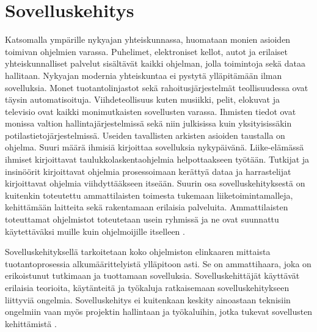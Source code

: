 \documentclass[utf8]{gradu3}
\begin{document}
\chapter{Sovelluskehitys}
Katsomalla ympärille nykyajan yhteiskunnassa, huomataan monien asioiden toimivan ohjelmien varassa. Puhelimet, elektroniset kellot, autot ja erilaiset yhteiskunnalliset palvelut sisältävät kaikki ohjelman, jolla toimintoja sekä dataa hallitaan. Nykyajan modernia yhteiskuntaa ei pystytä ylläpitämään ilman sovelluksia. Monet tuotantolinjastot sekä rahoitusjärjestelmät teollisuudessa ovat täysin automatisoituja. Viihdeteollisuus kuten musiikki, pelit, elokuvat ja televisio ovat kaikki monimutkaisten sovellusten varassa. Ihmisten tiedot ovat monissa valtion hallintajärjestelmissä sekä niin julkisissa kuin yksityisissäkin potilastietojärjestelmissä. Useiden tavallisten arkisten asioiden taustalla on ohjelma. Suuri määrä ihmisiä kirjoittaa sovelluksia nykypäivänä. Liike-elämässä ihmiset kirjoittavat taulukkolaskentaohjelmia helpottaakseen työtään. Tutkijat ja insinöörit kirjoittavat ohjelmia prosessoimaan kerättyä dataa ja harrastelijat kirjoittavat ohjelmia viihdyttääkseen itseään. Suurin osa sovelluskehityksestä on kuitenkin toteutettu ammattilaisten toimesta tukemaan liiketoimintamalleja, kehittämään laitteita sekä rakentamaan erilaisia palveluita. Ammattilaisten toteuttamat ohjelmistot toteutetaan usein ryhmissä ja ne ovat suunnattu käytettäväksi muille kuin ohjelmoijille itselleen \parencite[s.4]{Sommerville}.

Sovelluskehityksellä tarkoitetaan koko ohjelmiston elinkaaren mittaista tuotantoprosessia alkumäärittelyistä ylläpitoon asti. Se on ammattihaara, joka on erikoistunut tutkimaan ja tuottamaan sovelluksia. Sovelluskehittäjät käyttävät erilaisia teorioita, käytänteitä ja työkaluja ratkaisemaan sovelluskehitykseen liittyviä ongelmia. Sovelluskehitys ei kuitenkaan keskity ainoastaan teknisiin ongelmiin vaan myös projektin hallintaan ja työkaluihin, jotka tukevat sovellusten kehittämistä \parencite[s.1-10]{Sommerville}. 
\end{document}

